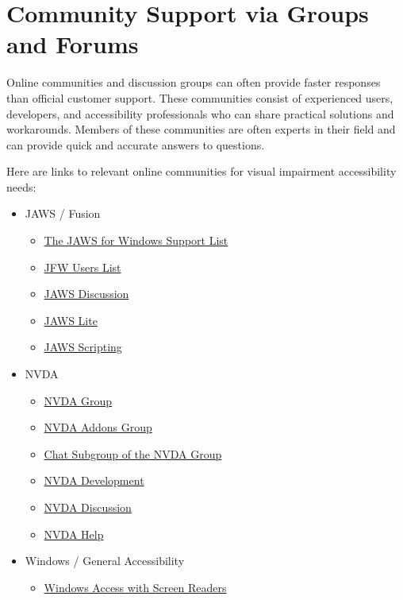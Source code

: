 \section{Community Support via Groups and Forums}\label{community}
Online communities and discussion groups can often provide faster responses than official customer support. These communities consist of experienced users, developers, and accessibility professionals who can share practical solutions and workarounds. Members of these communities are often experts in their field and can provide quick and accurate answers to questions.

Here are links to relevant online communities for visual impairment accessibility needs:

\begin{itemize}
 \item JAWS / Fusion
 \begin{itemize}
 \item \href{https://groups.io/g/jfw/}{The JAWS for Windows Support List}
 \item \href{https://groups.io/g/jfw-users/}{JFW Users List}
 \item \href{https://groups.io/g/jawsdiscussion/}{JAWS Discussion}
 \item \href{https://groups.io/g/jawslite/}{JAWS Lite}
 \item \href{https://groups.io/g/jawsscripting/}{JAWS Scripting}
 \end{itemize}
 \item NVDA
 \begin{itemize}
 \item \href{https://nvda.groups.io/g/nvda/}{NVDA Group}
 \item \href{https://nvda-addons.groups.io/g/nvda-addons}{NVDA Addons Group}
 \item \href{https://nvda.groups.io/g/chat/}{Chat Subgroup of the NVDA Group}
 \item \href{https://groups.io/g/nvda-devel/}{NVDA Development}
 \item \href{https://groups.io/g/nvdadiscussion/}{NVDA Discussion}
 \item \href{https://groups.io/g/NVDAhelp/}{NVDA Help}
 \end{itemize}
 \item Windows / General Accessibility
 \begin{itemize}
 \item \href{https://winaccess.groups.io/g/winaccess}{Windows Access with Screen Readers}
 \end{itemize}

\end{itemize}
